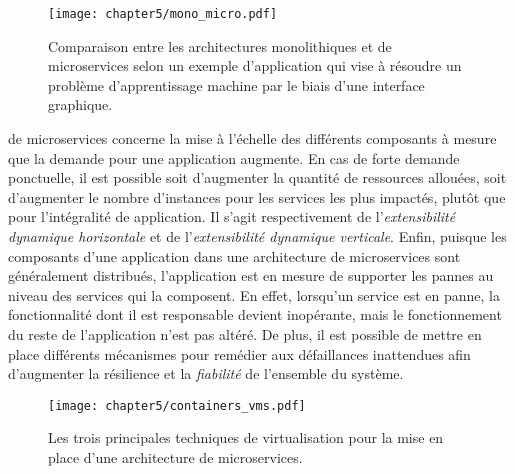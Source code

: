 \begin{figure}[H]
	\centering
	\texttt{[image: chapter5/mono\_micro.pdf]}
		\caption{Comparaison entre les architectures monolithiques et de microservices selon un exemple d'application qui vise à résoudre un problème d'apprentissage machine par le biais d'une interface graphique.}
	\label{fig:mono_micro}
\end{figure}

\noindent de microservices concerne la mise à l'échelle des différents composants à mesure que la demande pour une application augmente. En cas de forte demande ponctuelle, il est possible soit d'augmenter la quantité de ressources allouées, soit d'augmenter le nombre d'instances pour les services les plus impactés, plutôt que pour l'intégralité de application. Il s'agit respectivement de l'\emph{extensibilité dynamique horizontale} et de l'\emph{extensibilité dynamique verticale}. Enfin, puisque les composants d'une application dans une architecture de microservices sont généralement distribués, l'application est en mesure de supporter les pannes au niveau des services qui la composent. En effet, lorsqu'un service est en panne, la fonctionnalité dont il est responsable devient inopérante, mais le fonctionnement du reste de l'application n'est pas altéré. De plus, il est possible de mettre en place différents mécanismes pour remédier aux défaillances inattendues afin d'augmenter la résilience et la \emph{fiabilité} de l'ensemble du système.

\begin{figure}[hb!]
	\centering
	\texttt{[image: chapter5/containers\_vms.pdf]}
		\caption{Les trois principales techniques de virtualisation pour la mise en place d'une architecture de microservices.}
	\label{fig:containers_vms}
\end{figure}

